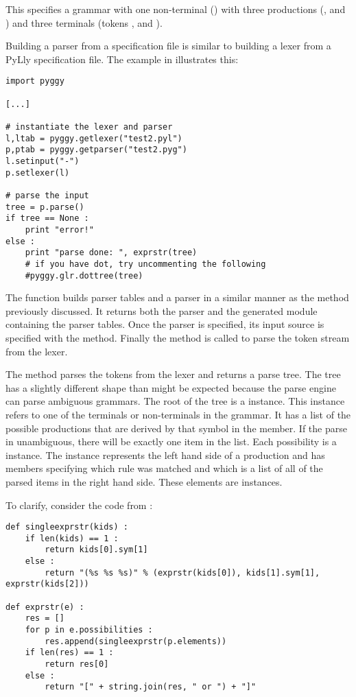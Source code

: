 This specifies a grammar with one non-terminal () with three
productions (,  and ) 
and three terminals (tokens ,  and ).

Building a parser from a specification file is similar to building
a lexer from a PyLly specification file.  The example in
 illustrates this:

\begin{verbatim}
import pyggy

[...]

# instantiate the lexer and parser
l,ltab = pyggy.getlexer("test2.pyl")
p,ptab = pyggy.getparser("test2.pyg")
l.setinput("-")
p.setlexer(l)

# parse the input
tree = p.parse()
if tree == None :
    print "error!"
else :
    print "parse done: ", exprstr(tree)
    # if you have dot, try uncommenting the following
    #pyggy.glr.dottree(tree)
\end{verbatim}

The  function builds parser tables and a parser
in a similar manner as the  method previously
discussed.  It returns both the parser and the generated module
containing the parser tables.  Once the parser is specified, its
input source is specified with the  method.   Finally
the  method is called to parse the token stream from
the lexer.

The  method parses the tokens from the lexer and returns 
a parse tree.  The tree has a slightly different shape than might be expected
because the parse engine can
parse ambiguous grammars.  The root of the tree is a
 instance.  This instance refers to one of the
terminals or non-terminals in the grammar.  It has a list
of the possible productions that are derived by that symbol in
the  member.  If the parse in unambiguous, there
will be exactly one item in the  list.
Each possibility is a  instance.  The 
instance represents the left hand side of a production and has
members  specifying which rule was matched and 
which is a list of all of the parsed items in the right hand side.  These
elements are  instances.

To clarify, consider the code from :

\begin{verbatim}
def singleexprstr(kids) :
    if len(kids) == 1 :
        return kids[0].sym[1]
    else :
        return "(%s %s %s)" % (exprstr(kids[0]), kids[1].sym[1], exprstr(kids[2]))

def exprstr(e) :
    res = []
    for p in e.possibilities :
        res.append(singleexprstr(p.elements))
    if len(res) == 1 :
        return res[0]
    else :
        return "[" + string.join(res, " or ") + "]"
\end{verbatim}
 
